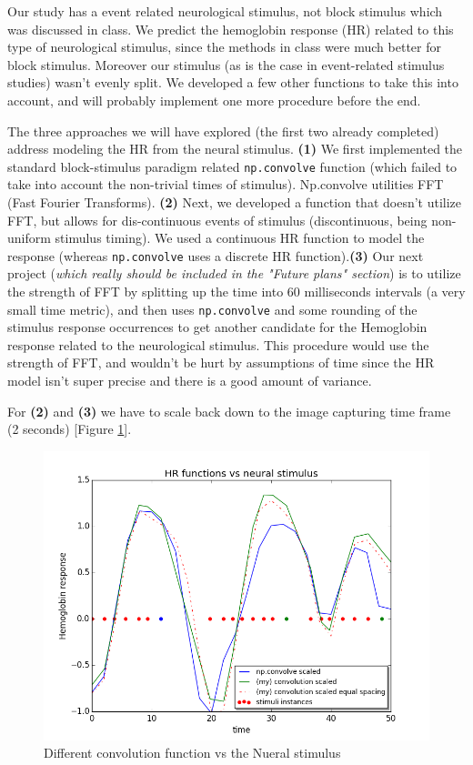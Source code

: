 \par  \indent Our study has a event related neurological stimulus, not block stimulus which was discussed in class. We predict the hemoglobin response (HR) related to this type of neurological stimulus, since the methods in class were much better for block stimulus. Moreover our stimulus (as is the case in event-related stimulus studies) wasn't evenly split. We developed a few other functions to take this into account, and will probably implement one more procedure before the end.

\par  The three approaches we will have explored (the first two already completed) address modeling the HR from the neural stimulus. \textbf{(1)} We first implemented the standard block-stimulus paradigm related \texttt{np.convolve} function (which failed to take into account the non-trivial times of stimulus). Np.convolve utilities FFT (Fast Fourier Transforms). \textbf{(2)} Next, we developed a function that doesn't utilize FFT, but allows for dis-continuous events of stimulus (discontinuous, being non-uniform stimulus timing). We used a continuous HR function to model the response (whereas \texttt{np.convolve} uses a discrete HR function).\textbf{(3)} Our next project (\textit{which really should be included in the "Future plans" section}) is to utilize the strength of FFT by splitting up the time into 60 milliseconds intervals (a very small time metric), and then uses \texttt{np.convolve} and some rounding of the stimulus response occurrences to get another candidate for the Hemoglobin response related to the neurological stimulus. This procedure would use the strength of FFT, and wouldn't be hurt by assumptions of time since the HR model isn't super precise and there is a good amount of variance.
    
\par   For \textbf{(2)} and \textbf{(3)} we have to scale back down to the image capturing time frame (2 seconds) [Figure \ref{fig:convolution}].


\begin{figure}[ht]
\centering
\includegraphics[scale=0.5]{images/convolution_vs_neural_stimulus} 
\caption{Different convolution function vs the Nueral stimulus}
\label{fig:convolution}
\end{figure}


